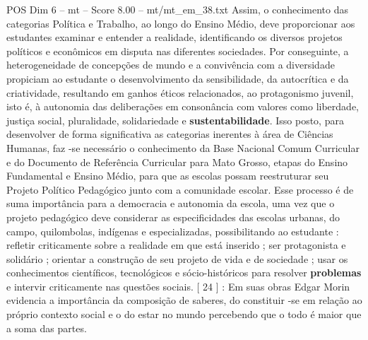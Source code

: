 \begin{textsample}{POS Dim 6 – mt – Score 8.00 – mt/mt\_em\_38.txt}
Assim, o conhecimento das categorias Política e Trabalho, ao longo do Ensino Médio, deve proporcionar aos estudantes examinar e entender a realidade, identificando os diversos projetos políticos e econômicos em disputa nas diferentes sociedades.
Por conseguinte, a heterogeneidade de concepções de mundo e a convivência com a diversidade propiciam ao estudante o desenvolvimento da sensibilidade, da autocrítica e da criatividade, resultando em ganhos éticos relacionados, ao protagonismo juvenil, isto é, à autonomia das deliberações em consonância com valores como liberdade, justiça social, pluralidade, solidariedade e \textbf{sustentabilidade}.
Isso posto, para desenvolver de forma significativa as categorias inerentes à área de Ciências Humanas, faz -se necessário o conhecimento da Base Nacional Comum Curricular e do Documento de Referência Curricular para Mato Grosso, etapas do Ensino Fundamental e Ensino Médio, para que as escolas possam reestruturar seu Projeto Político Pedagógico junto com a comunidade escolar.
Esse processo é de suma importância para a democracia e autonomia da escola, uma vez que o projeto pedagógico deve considerar as especificidades das escolas urbanas, do campo, quilombolas, indígenas e especializadas, possibilitando ao estudante : refletir criticamente sobre a realidade em que está inserido ; ser protagonista e solidário ; orientar a construção de seu projeto de vida e de sociedade ; usar os conhecimentos científicos, tecnológicos e sócio-históricos para resolver \textbf{problemas} e intervir criticamente nas questões sociais. [ 24 ] : Em suas obras Edgar Morin evidencia a importância da composição de saberes, do constituir -se em relação ao próprio contexto social e o do estar no mundo percebendo que o todo é maior que a soma das partes.

\end{textsample}
